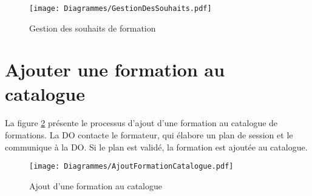\begin{figure}[H]
\centering
		\texttt{[image: Diagrammes/GestionDesSouhaits.pdf]}
	\caption{Gestion des souhaits de formation}
	\label{souhaits}
\end{figure}


\section{Ajouter une formation au catalogue}
\paragraph{} La figure \ref{addFormation} présente le processus d'ajout d'une formation au catalogue de formations. La DO contacte le formateur, qui élabore un plan de session et le communique à la DO. Si le plan est validé, la formation est ajoutée au catalogue.


\begin{figure}[H]
\centering
		\texttt{[image: Diagrammes/AjoutFormationCatalogue.pdf]}
	\caption{Ajout d'une formation au catalogue}
	\label{addFormation}
\end{figure}